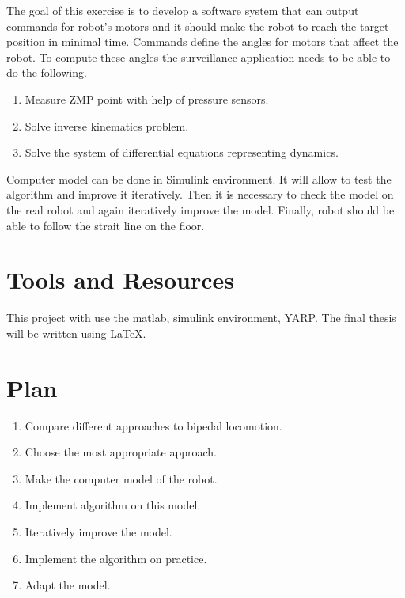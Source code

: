 \documentclass[11pt,a4paper]{article}
\begin{document}
The goal of this exercise is to develop a software system that can output commands for robot's motors and it should make the robot to reach the target position in minimal time. Commands define the angles for motors that affect the robot. To compute these angles the surveillance application needs to be able to do the following.
\begin{enumerate}
\item Measure ZMP point with help of pressure sensors.
\item Solve inverse kinematics problem.
\item Solve the system of differential equations representing dynamics.
\end{enumerate}
Computer model can be done in Simulink environment. It will allow to test the algorithm and improve it iteratively. Then it is necessary to check the model on the real robot and again iteratively improve the model. Finally, robot should be able to follow the strait line on the floor. 

\section{Tools and Resources}

This project with use the matlab, simulink environment, YARP. The final thesis will be written using \LaTeX \cite{Lamport86}.
 
\section{Plan}
\begin{enumerate}
	\item
		Compare different approaches to bipedal locomotion.
	\item
		Choose the most appropriate approach.
	\item
		Make the computer model of the robot.
	\item
		Implement algorithm on this model.
	\item
		Iteratively improve the model.
	\item
		Implement the algorithm on practice.
	\item
		Adapt the model.
\end{enumerate}


 
%
  
\end{document}
